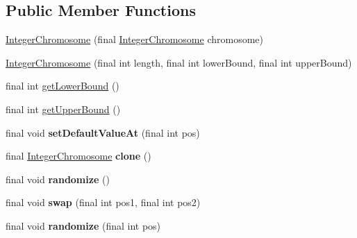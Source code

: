 \subsection*{Public Member Functions}
\begin{DoxyCompactItemize}
\item 
\hyperlink{classjenes_1_1chromosome_1_1_integer_chromosome_a10f477c2c6fb3893a0fc331a933e5b39}{Integer\-Chromosome} (final \hyperlink{classjenes_1_1chromosome_1_1_integer_chromosome}{Integer\-Chromosome} chromosome)
\item 
\hyperlink{classjenes_1_1chromosome_1_1_integer_chromosome_a44849b4866ead257aacae333ad7737bd}{Integer\-Chromosome} (final int length, final int lower\-Bound, final int upper\-Bound)
\item 
final int \hyperlink{classjenes_1_1chromosome_1_1_integer_chromosome_ae3932d5f359d42a6fb783f9254e870b7}{get\-Lower\-Bound} ()
\item 
final int \hyperlink{classjenes_1_1chromosome_1_1_integer_chromosome_af5a9d680853b67fd2ad8fc96853957d5}{get\-Upper\-Bound} ()
\item 
\hypertarget{classjenes_1_1chromosome_1_1_integer_chromosome_afa0e3d50dbda7f0c84f8558776543d7c}{final void {\bfseries set\-Default\-Value\-At} (final int pos)}\label{classjenes_1_1chromosome_1_1_integer_chromosome_afa0e3d50dbda7f0c84f8558776543d7c}

\item 
\hypertarget{classjenes_1_1chromosome_1_1_integer_chromosome_a9189b20273989ee1e83aa21ca11a982d}{final \hyperlink{classjenes_1_1chromosome_1_1_integer_chromosome}{Integer\-Chromosome} {\bfseries clone} ()}\label{classjenes_1_1chromosome_1_1_integer_chromosome_a9189b20273989ee1e83aa21ca11a982d}

\item 
\hypertarget{classjenes_1_1chromosome_1_1_integer_chromosome_a8474f73dce296ea5625dc9edb235cd47}{final void {\bfseries randomize} ()}\label{classjenes_1_1chromosome_1_1_integer_chromosome_a8474f73dce296ea5625dc9edb235cd47}

\item 
\hypertarget{classjenes_1_1chromosome_1_1_integer_chromosome_a2a591c336fedcfd457d4d874a2db328e}{final void {\bfseries swap} (final int pos1, final int pos2)}\label{classjenes_1_1chromosome_1_1_integer_chromosome_a2a591c336fedcfd457d4d874a2db328e}

\item 
\hypertarget{classjenes_1_1chromosome_1_1_integer_chromosome_a5f05ea95b9e86f784f6f1bdff3cbfe54}{final void {\bfseries randomize} (final int pos)}\label{classjenes_1_1chromosome_1_1_integer_chromosome_a5f05ea95b9e86f784f6f1bdff3cbfe54}


\end{DoxyCompactItemize}
